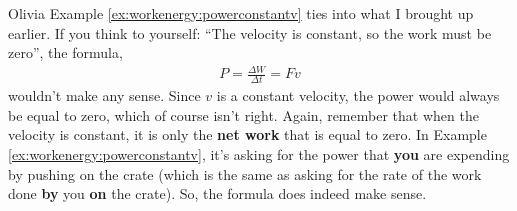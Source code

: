 \begin{studentOpinion}{Olivia} Example \ref{ex:workenergy:powerconstantv} ties into what I brought up earlier. If you think to yourself: ``The velocity is constant, so the work must be zero'', the formula,
\begin{align*}
P = \frac{\Delta W}{\Delta t} = Fv
\end{align*}
wouldn't make any sense. Since $v$ is a constant velocity, the power would always be equal to zero, which of course isn't right. Again, remember that when the velocity is constant, it is only the \textbf{net work} that is equal to zero. In Example \ref{ex:workenergy:powerconstantv}, it's asking for the power that \textbf{you} are expending by pushing on the crate (which is the same as asking for the rate of the work done \textbf{by} you \textbf{on} the crate). So, the formula does indeed make sense. 
\end{studentOpinion}


\newpage
